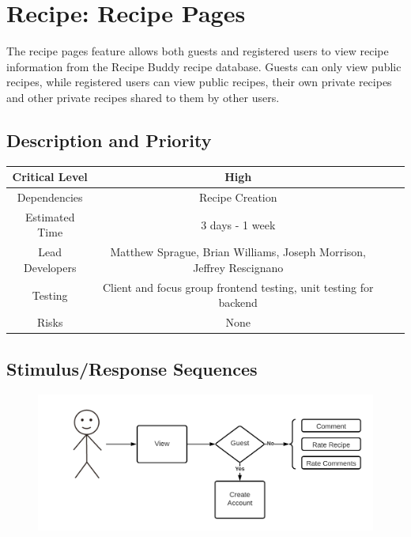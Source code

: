 \documentclass{scrreprt}
\begin{document}
\section{Recipe: Recipe Pages}

The recipe pages feature allows both guests and registered users to view recipe information from the \gls{Recipe Buddy} recipe database. Guests can only view public recipes, while registered users can view public recipes, their own private recipes and other private recipes shared to them by other users.

\subsection{Description and Priority}
\begin{center}
    \begin{tabular}{| c | c | c | c |}
        \hline
        Critical Level  & High                                                                 \\
        \hline
        Dependencies    & Recipe Creation                                                      \\
        \hline
        Estimated Time  & 3 days - 1 week                                                      \\
        \hline
        Lead Developers & Matthew Sprague, Brian Williams, Joseph Morrison, Jeffrey Rescignano \\
        \hline
        Testing         & Client and focus group frontend testing, unit testing for backend    \\
        \hline
        Risks           & None                                                                 \\
        \hline
    \end{tabular}
\end{center}

\subsection{Stimulus/Response Sequences}

\begin{figure}[H]\centering
    \includegraphics[width=\columnwidth]{FlowCharts/Recipe-Pages.png}
\end{figure}
\end{document}
